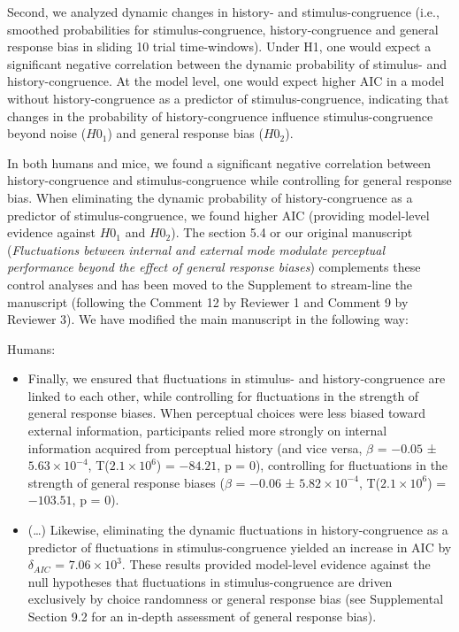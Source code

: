 \documentclass[
]{article}
\begin{document}
Second, we analyzed dynamic changes in history- and stimulus-congruence
(i.e., smoothed probabilities for stimulus-congruence,
history-congruence and general response bias in sliding 10 trial
time-windows). Under H1, one would expect a significant negative
correlation between the dynamic probability of stimulus- and
history-congruence. At the model level, one would expect higher AIC in a
model without history-congruence as a predictor of stimulus-congruence,
indicating that changes in the probability of history-congruence
influence stimulus-congruence beyond noise (\(H0_1\)) and general
response bias (\(H0_2\)).

In both humans and mice, we found a significant negative correlation
between history-congruence and stimulus-congruence while controlling for
general response bias. When eliminating the dynamic probability of
history-congruence as a predictor of stimulus-congruence, we found
higher AIC (providing model-level evidence against \(H0_1\) and
\(H0_2\)). The section 5.4 or our original manuscript
(\emph{Fluctuations between internal and external mode modulate
perceptual performance beyond the effect of general response biases})
complements these control analyses and has been moved to the Supplement
to stream-line the manuscript (following the Comment 12 by Reviewer 1
and Comment 9 by Reviewer 3). We have modified the main manuscript in
the following way:

Humans:

\begin{itemize}
\item
  Finally, we ensured that fluctuations in stimulus- and
  history-congruence are linked to each other, while controlling for
  fluctuations in the strength of general response biases. When
  perceptual choices were less biased toward external information,
  participants relied more strongly on internal information acquired
  from perceptual history (and vice versa, \(\beta\) = \(-0.05\) ±
  \(\ensuremath{5.63\times 10^{-4}}\),
  T(\(\ensuremath{2.1\times 10^{6}}\)) = \(-84.21\), p = \(0\)),
  controlling for fluctuations in the strength of general response
  biases (\(\beta\) = \(-0.06\) ± \(\ensuremath{5.82\times 10^{-4}}\),
  T(\(\ensuremath{2.1\times 10^{6}}\)) = \(-103.51\), p = \(0\)).
\item
  (\ldots) Likewise, eliminating the dynamic fluctuations in
  history-congruence as a predictor of fluctuations in
  stimulus-congruence yielded an increase in AIC by \(\delta_{AIC}\) =
  \(\ensuremath{7.06\times 10^{3}}\). These results provided model-level
  evidence against the null hypotheses that fluctuations in
  stimulus-congruence are driven exclusively by choice randomness or
  general response bias (see Supplemental Section 9.2 for an in-depth
  assessment of general response bias).
\end{itemize}
\end{document}
